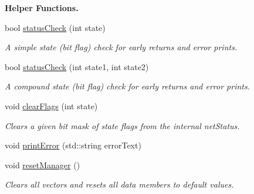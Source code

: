 \begin{Indent}{\bf Helper Functions.}\par
\begin{DoxyCompactItemize}
\item 
bool \hyperlink{classNetManager_a8eb8d5a292070e7269133bf1fc1499c4}{status\-Check} (int state)
\begin{DoxyCompactList}\small\item\em A simple state (bit flag) check for early returns and error prints. \end{DoxyCompactList}\item 
bool \hyperlink{classNetManager_aa5616571aa520977c221d8a8a6471a1f}{status\-Check} (int state1, int state2)
\begin{DoxyCompactList}\small\item\em A compound state (bit flag) check for early returns and error prints. \end{DoxyCompactList}\item 
void \hyperlink{classNetManager_a9f55bdec9b5c974d26354e680aa48d1e}{clear\-Flags} (int state)
\begin{DoxyCompactList}\small\item\em Clears a given bit mask of state flags from the internal net\-Status. \end{DoxyCompactList}\item 
void \hyperlink{classNetManager_af47665c6082b5f038350dcf4610929bf}{print\-Error} (std\-::string error\-Text)
\item 
void \hyperlink{classNetManager_a60e404905712ff726f1a4f0e2542d06c}{reset\-Manager} ()
\begin{DoxyCompactList}\small\item\em Clears all vectors and resets all data members to default values. \end{DoxyCompactList}\end{DoxyCompactItemize}
\end{Indent}
